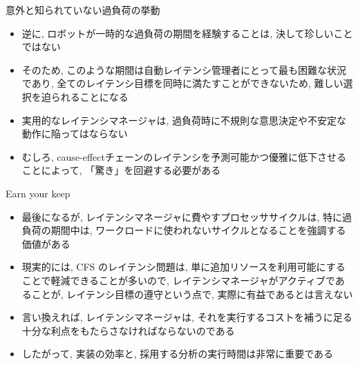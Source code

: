 \begin{frame}{意外と知られていない過負荷の挙動}
    \begin{itemize}
        \item 逆に, ロボットが一時的な過負荷の期間を経験することは, 決して珍しいことではない
        \item そのため, このような期間は自動レイテンシ管理者にとって最も困難な状況であり, 全てのレイテンシ目標を同時に満たすことができないため, 難しい選択を迫られることになる
        \item 実用的なレイテンシマネージャは, 過負荷時に不規則な意思決定や不安定な動作に陥ってはならない
        \item むしろ, cause-effectチェーンのレイテンシを予測可能かつ優雅に低下させることによって, 「驚き」を回避する必要がある
    \end{itemize}
\end{frame}

\begin{frame}{Earn your keep}
    \begin{itemize}
        \item 最後になるが, レイテンシマネージャに費やすプロセッササイクルは, 特に過負荷の期間中は, ワークロードに使われないサイクルとなることを強調する価値がある
        \item 現実的には, CFS のレイテンシ問題は, 単に追加リソースを利用可能にすることで軽減できることが多いので, レイテンシマネージャがアクティブであることが, レイテンシ目標の遵守という点で, 実際に有益であるとは言えない
        \item 言い換えれば, レイテンシマネージャは, それを実行するコストを補うに足る十分な利点をもたらさなければならないのである
        \item したがって, 実装の効率と, 採用する分析の実行時間は非常に重要である
    \end{itemize}
\end{frame}
